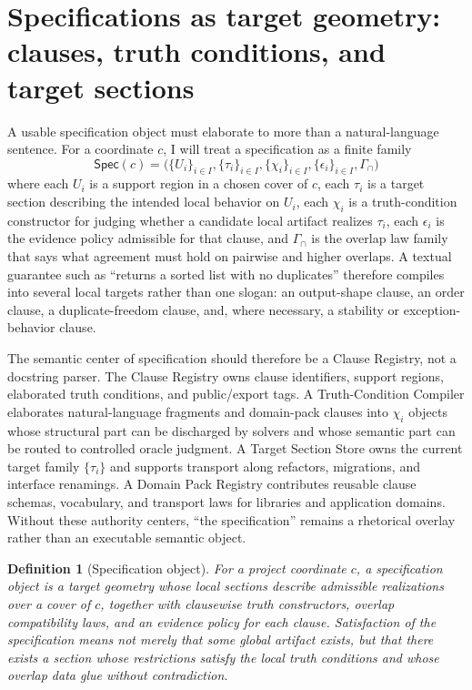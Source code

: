 \documentclass[11pt]{report}
\newtheorem{definition}{Definition}[chapter]
\newcommand{\Spec}{\mathsf{Spec}}
\begin{document}
\section{Specifications as target geometry: clauses, truth conditions, and target sections}
A usable specification object must elaborate to more than a natural-language sentence. For a coordinate $c$, I will treat a specification as a finite family
\[
\Spec(c)=\bigl(\{U_i\}_{i\in I},\{\tau_i\}_{i\in I},\{\chi_i\}_{i\in I},\{\epsilon_i\}_{i\in I},\Gamma_{\!\cap}\bigr)
\]
where each $U_i$ is a support region in a chosen cover of $c$, each $\tau_i$ is a target section describing the intended local behavior on $U_i$, each $\chi_i$ is a truth-condition constructor for judging whether a candidate local artifact realizes $\tau_i$, each $\epsilon_i$ is the evidence policy admissible for that clause, and $\Gamma_{\!\cap}$ is the overlap law family that says what agreement must hold on pairwise and higher overlaps. A textual guarantee such as ``returns a sorted list with no duplicates'' therefore compiles into several local targets rather than one slogan: an output-shape clause, an order clause, a duplicate-freedom clause, and, where necessary, a stability or exception-behavior clause.

The semantic center of specification should therefore be a Clause Registry, not a docstring parser. The Clause Registry owns clause identifiers, support regions, elaborated truth conditions, and public/export tags. A Truth-Condition Compiler elaborates natural-language fragments and domain-pack clauses into $\chi_i$ objects whose structural part can be discharged by solvers and whose semantic part can be routed to controlled oracle judgment. A Target Section Store owns the current target family $\{\tau_i\}$ and supports transport along refactors, migrations, and interface renamings. A Domain Pack Registry contributes reusable clause schemas, vocabulary, and transport laws for libraries and application domains. Without these authority centers, ``the specification'' remains a rhetorical overlay rather than an executable semantic object.

\begin{definition}[Specification object]
For a project coordinate $c$, a specification object is a target geometry whose local sections describe admissible realizations over a cover of $c$, together with clausewise truth constructors, overlap compatibility laws, and an evidence policy for each clause. Satisfaction of the specification means not merely that some global artifact exists, but that there exists a section whose restrictions satisfy the local truth conditions and whose overlap data glue without contradiction.
\end{definition}
\end{document}
